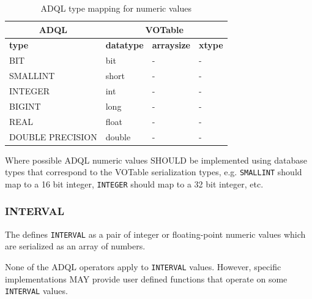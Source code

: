 \documentclass[11pt,a4paper]{ivoa}
\begin{document}
\begin{table}[th]\footnotesize
    \begin{tabular}
        {|p{}|p{}|p{}|p{}|}
        
        \hline
        \multicolumn{1}{|c|}{\textbf{ADQL}} &
        \multicolumn{3}{c|}{\textbf{VOTable}}
        \tabularnewline
        
        \hline
        \textbf{type} &
        \textbf{datatype} &
        \textbf{arraysize} &
        \textbf{xtype}
        \tabularnewline

        \hline
        BIT &
        bit &
        - &
        -
        \tabularnewline

        \hline
        SMALLINT &
        short &
        - &
        -
        \tabularnewline

        \hline
        INTEGER &
        int &
        - &
        -
        \tabularnewline

        \hline
        BIGINT &
        long &
        - &
        -
        \tabularnewline

        \hline
        REAL &
        float &
        - &
        -
        \tabularnewline

        \hline
        DOUBLE PRECISION &
        double &
        - &
        -
        \tabularnewline
        \hline
    \end{tabular}
    \caption{ADQL type mapping for numeric values}
    \label{table:types.numeric.primitive}
\end{table}

Where possible ADQL numeric values SHOULD be implemented using database types
that correspond to the VOTable serialization types, e.g. \verb:SMALLINT: should
map to a 16 bit integer, \verb:INTEGER: should map to a 32 bit integer, etc. 

\subsubsection{INTERVAL}
\label{sec:types.numeric.interval}

The \DALISpec{} defines \verb:INTERVAL: as a pair of integer or floating-point
numeric values which are serialized as an array of numbers.

None of the ADQL operators apply to \verb:INTERVAL: values.
However, specific implementations MAY provide user defined functions that
operate on some \verb:INTERVAL: values.
\end{document}
